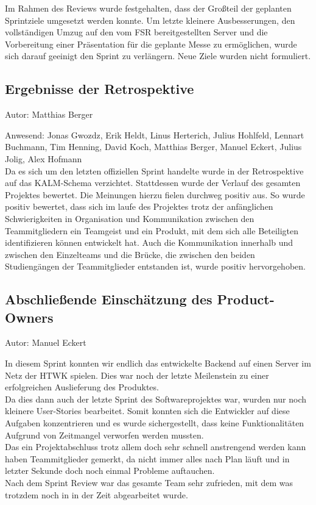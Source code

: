 Im Rahmen des Reviews wurde festgehalten, dass der Großteil der geplanten  Sprintziele umgesetzt werden konnte. Um letzte kleinere Ausbesserungen, den vollständigen Umzug auf den vom FSR bereitgestellten Server und die Vorbereitung einer Präsentation für die geplante Messe zu ermöglichen, wurde sich darauf geeinigt den Sprint zu verlängern. Neue Ziele wurden nicht formuliert.

\subsection{Ergebnisse der Retrospektive}
{\small Autor: Matthias Berger}

Anwesend: Jonas Gwozdz, Erik Heldt, Linus Herterich, Julius Hohlfeld, Lennart Buchmann, Tim Henning, David Koch, Matthias Berger, Manuel Eckert, Julius Jolig, Alex Hofmann\\

Da es sich um den letzten offiziellen Sprint handelte wurde in der Retrospektive auf das KALM-Schema verzichtet. Stattdessen wurde der Verlauf des gesamten Projektes bewertet. Die Meinungen hierzu fielen durchweg positiv aus. So wurde  positiv bewertet, dass sich im laufe des Projektes trotz der anfänglichen Schwierigkeiten in Organisation und Kommunikation zwischen den Teammitgliedern ein Teamgeist und ein Produkt, mit dem sich alle Beteiligten identifizieren können entwickelt hat. Auch die Kommunikation innerhalb und zwischen den Einzelteams und die Brücke, die zwischen den beiden Studiengängen der Teammitglieder entstanden ist, wurde positiv hervorgehoben.

\subsection{Abschließende Einschätzung des Product-Owners}
{\small Autor: Manuel Eckert}

In diesem Sprint konnten wir endlich das entwickelte Backend auf einen Server im Netz der HTWK spielen. Dies war noch der letzte Meilenstein zu einer erfolgreichen Auslieferung des Produktes. \\
Da dies dann auch der letzte Sprint des Softwareprojektes war, wurden nur noch kleinere User-Stories bearbeitet. Somit konnten sich die Entwickler auf diese Aufgaben konzentrieren und es wurde sichergestellt, dass keine Funktionalitäten Aufgrund von Zeitmangel verworfen werden mussten. \\
Das ein Projektabschluss trotz allem doch sehr schnell anstrengend werden kann haben Teammitglieder gemerkt, da nicht immer alles nach Plan läuft und in letzter Sekunde doch noch einmal Probleme auftauchen. \\
Nach dem Sprint Review war das gesamte Team sehr zufrieden, mit dem was trotzdem noch in in der Zeit abgearbeitet wurde. \\ 

